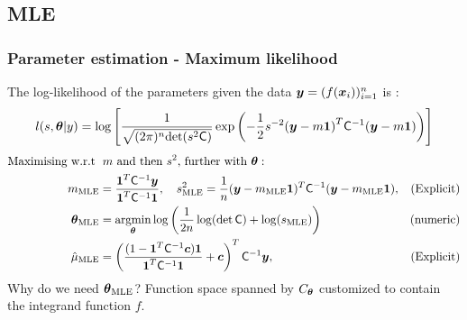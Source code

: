 \documentclass[10pt,compress,xcolor={usenames,dvipsnames}]{beamer} %
\newcommand{\bm}[1]{\boldsymbol{#1}}
\newcommand{\MLE}{\textup{MLE}}
\newcommand{\mCInv}{\mC^{-1}}
\newcommand{\vthetaMLE}{{\vtheta}_{\MLE}}
\begin{document}
\subsection{MLE}


\begin{frame}
\frametitle{Parameter estimation - Maximum likelihood}
\vspace*{-6ex}
The log-likelihood of the parameters given the data $\boldsymbol{y} = (f(\boldsymbol{x}_i))_{i=1}^{n}$ is :
\vspace*{-2.0ex}
\begin{align*}
\displaystyle
l(s,\vtheta|y)=
\log
\left[
\frac{1}
{\sqrt{(2\pi)^n\text{det}(s^2\mC)}}
\exp{\left(
-\frac{1}{2}s^{-2}{(\vy-m\bm{1})}^T \mC^{-1} (\vy-m\bm{1})
\right)}
\right]
\end{align*}
\pause
\vspace{-4ex}
\begin{align*}
\text{Maximising w.r.t }&\;  m \text{ and then $s^2$, further with $\vtheta$}: \;
\\
m_{\MLE} &= \frac{\bm{1}^T \mC^{-1} \vy}{\bm{1}^T \mC^{-1} \bm{1}}, \quad
s^2_{\MLE} =
\frac{1}{n} (\vy-m_{\MLE}\bm{1})^T \mC^{-1} (\vy-m_{\MLE}\bm{1})  , & \text{(Explicit)}
\\
\vthetaMLE &= \argmin_{\vtheta}
\log
\left(
\frac{1}{2n} \log(\det \mC) + \log(s_\MLE)
\right)
 & \text{(numeric)}
\\
\hmu_\MLE  &= 
\left(
\frac{ (1 - \vone^T  \mCInv\vc )  \vone }{ \vone^T \mCInv \vone}   +  \vc 
\right)^T  \mCInv \vy  , & \text{(Explicit)}
\end{align*}
\pause %
\alert{Why do we need $\vtheta_{\MLE}$?} \quad Function space spanned by $C_{\boldsymbol{\theta}}$ customized to contain the integrand function $f$.
\end{frame}
\end{document}
